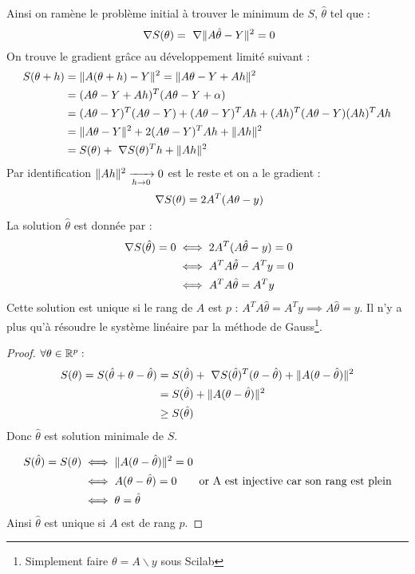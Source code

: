 		Ainsi on ramène le problème initial à trouver le minimum de $S$, $\hat\theta$ tel que :
		$$
			~\nabla S(\theta) = ~\nabla \lVert A \hat\theta - Y \rVert^2 = 0
		$$
		On trouve le gradient grâce au développement limité suivant :
		\begin{align*}
			S(\theta + h) 	&= \lVert A(\theta+h)-Y \rVert^2 = \lVert A\theta-Y+Ah \rVert^2								\\
							&= (A\theta-Y+Ah)^T (A\theta-Y+\alpha)											\\
							&= (A\theta-Y)^T(A\theta-Y) + (A\theta-Y)^T Ah + (Ah)^T (A\theta-Y) (Ah)^T Ah	\\
							&= \lVert A\theta-Y \rVert^2 + 2(A\theta-Y)^T Ah + \lVert Ah \rVert^2							\\
							&= S(\theta) + ~\nabla S(\theta)^T h + \lVert Ah \rVert^2
		\end{align*}
		Par identification $\lVert Ah \rVert^2\xrightarrow[h \to 0]{}0$ est le reste et on a le gradient :
		\begin{equation}
			\label{eq-5-gradLLS}
			~\nabla S(\theta) = 2 A^T (A\theta -y)
		\end{equation}

		La solution $\hat\theta$ est donnée par :
		\begin{align*}
			~\nabla S(\hat\theta) = 0	&\iff 2 A^T (A\hat\theta -y) = 0		\\
									&\iff A^T A\hat\theta - A^Ty = 0		\\
									&\iff A^T A\hat\theta = A^Ty		
		\end{align*}
		Cette solution est unique si le rang de $A$ est $p$ : $A^T A\hat\theta = A^Ty \implies A\hat\theta = y$.
		Il n'y a plus qu'à résoudre le système linéaire par la méthode de Gauss\footnote{Simplement faire $\theta = A\backslash y$ sous Scilab}.

		\begin{proof}
			$\forall \theta \in \mathbb{R}^p :$
			\begin{align*}
				S(\theta) = S(\hat\theta + \theta - \hat\theta)
					&= S(\hat\theta) + ~\nabla S(\hat\theta)^T (\theta - \hat\theta) + \lVert A(\theta -\hat\theta) \rVert^2 \\
					&= S(\hat\theta) + \lVert A(\theta -\hat\theta) \rVert^2 \\
					&\geq S(\hat\theta)
			\end{align*}
			Donc $\hat\theta$ est solution minimale de $S$.

			\begin{align*}
				S(\hat\theta) = S(\theta) 	&\iff \lVert A(\theta - \hat\theta) \rVert^2 = 0			\\
											&\iff A(\theta - \hat\theta) = 0 \text{\qquad or A est injective car son rang est plein}	\\
											&\iff \theta = \hat\theta
			\end{align*}
			Ainsi $\hat\theta$ est unique si $A$ est de rang $p$.
		\end{proof}

